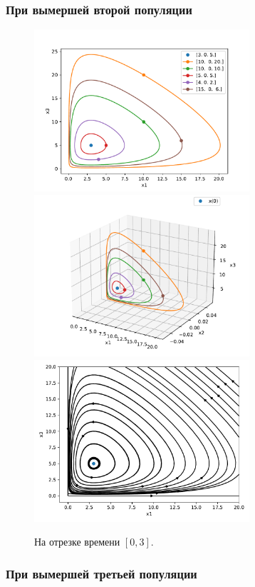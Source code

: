     \subsubsection{При вымершей второй популяции}

    \begin{figure}[H]
        \centering
        \includegraphics[width=8cm]{pictures/x2_0phase.pdf}
        \includegraphics[width=8cm]{pictures/x2_0phase3.pdf}
        \includegraphics[width=8cm]{pictures/x2_0vector.pdf}
        \caption{На отрезке времени \( [0, 3] \).}
    \end{figure}


    \subsubsection{При вымершей третьей популяции}

